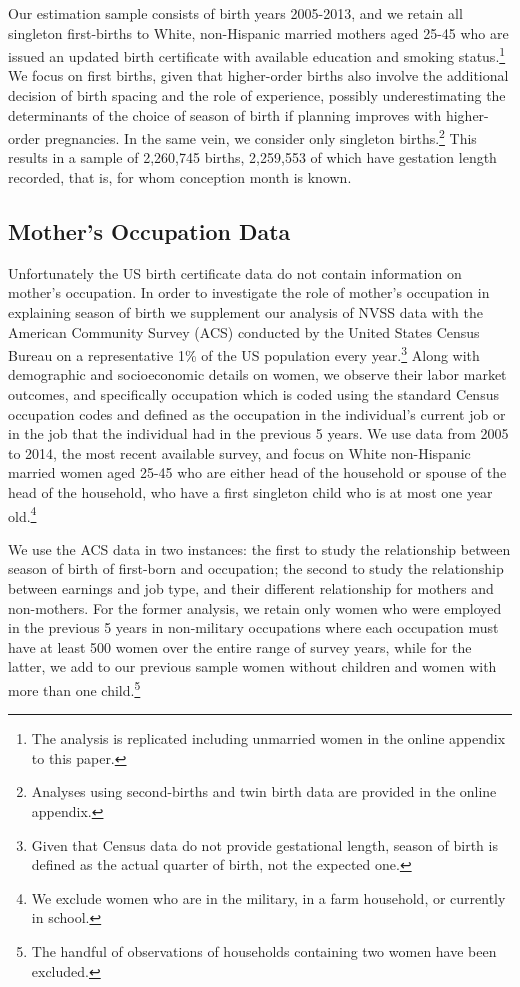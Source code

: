 \documentclass[a4paper, 11.5 pt]{article}
\theoremstyle{plain}
\begin{document}
\begin{doublespace}
Our estimation sample consists of birth years 2005-2013, and we retain all singleton first-births to White, non-Hispanic married mothers aged 25-45 who are issued an updated birth certificate with available education and smoking status.\footnote{The analysis is replicated including unmarried women in the online appendix to this paper.} We focus on first births, given that higher-order births also involve the additional decision of birth spacing and the role of experience, possibly underestimating the determinants of the choice of season of birth if planning improves with higher-order pregnancies. In the same vein, we consider only singleton births.\footnote{ Analyses using second-births and twin birth data are provided in the online appendix.} This results in a sample of 2,260,745 births, 2,259,553 of which have gestation length recorded, that is, for whom conception month is known.


\subsection{Mother's Occupation Data}
Unfortunately the US birth certificate data do not contain information on mother's occupation. In order to investigate the role of mother's occupation in explaining season of birth we supplement our analysis of NVSS data with the American Community Survey (ACS) conducted by the United States Census Bureau on a representative 1\% of the US population every year.\footnote{ Given that Census data do not provide gestational length, season of birth is defined as the actual quarter of birth, not the expected one.} Along with demographic and socioeconomic details on women, we observe their labor market outcomes, and specifically occupation which is coded using the standard Census occupation codes and defined as the occupation in the individual's current job or in the job that the individual had in the previous 5 years. We use data from 2005 to 2014, the most recent available survey, and focus on White non-Hispanic married women aged 25-45 who are either head of the household or spouse of the head of the household, who have a first singleton child who is at most one year old.\footnote{We exclude women who are in the military, in a farm household, or currently in school.}

We use the ACS data in two instances: the first to study the relationship between season of birth of first-born and occupation; the second to study the relationship between earnings and job type, and their different relationship for mothers and non-mothers. For the former analysis, we retain only women who were employed in the previous 5 years in non-military occupations where each occupation must have at least 500 women over the entire range of survey years, while for the latter, we add to our previous sample women without children and women with more than one child.\footnote{ The handful of observations of households containing two women have been excluded.}



\end{doublespace}
\end{document}
